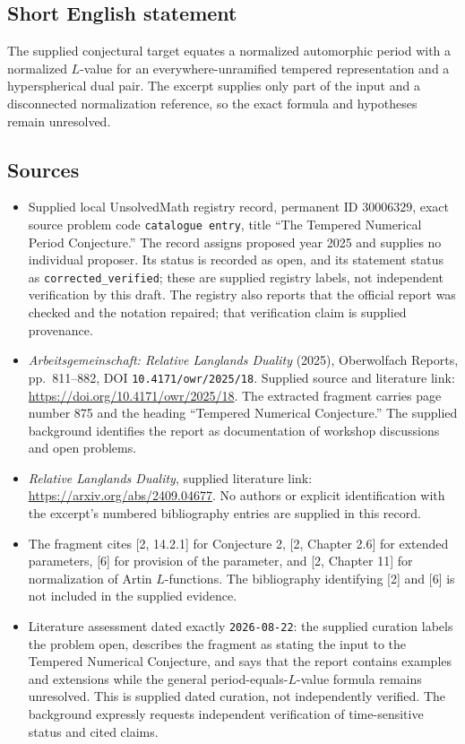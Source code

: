 \documentclass[11pt]{article}
\begin{document}
\subsection{Short English statement}
The supplied conjectural target equates a normalized automorphic period with a normalized \(L\)-value for an everywhere-unramified tempered representation and a hyperspherical dual pair. The excerpt supplies only part of the input and a disconnected normalization reference, so the exact formula and hypotheses remain unresolved.
\subsection{Sources}
\begin{itemize}
\item Supplied local UnsolvedMath registry record, permanent ID \(30006329\), exact source problem code \texttt{catalogue entry}, title ``The Tempered Numerical Period Conjecture.'' The record assigns proposed year 2025 and supplies no individual proposer. Its status is recorded as open, and its statement status as \texttt{corrected\_verified}; these are supplied registry labels, not independent verification by this draft. The registry also reports that the official report was checked and the notation repaired; that verification claim is supplied provenance.
\item \emph{Arbeitsgemeinschaft: Relative Langlands Duality} (2025), Oberwolfach Reports, pp.~811--882, DOI \texttt{10.4171/owr/2025/18}. Supplied source and literature link: \url{https://doi.org/10.4171/owr/2025/18}. The extracted fragment carries page number 875 and the heading ``Tempered Numerical Conjecture.'' The supplied background identifies the report as documentation of workshop discussions and open problems.
\item \emph{Relative Langlands Duality}, supplied literature link: \url{https://arxiv.org/abs/2409.04677}. No authors or explicit identification with the excerpt's numbered bibliography entries are supplied in this record.
\item The fragment cites [2, 14.2.1] for Conjecture 2, [2, Chapter 2.6] for extended parameters, [6] for provision of the parameter, and [2, Chapter 11] for normalization of Artin \(L\)-functions. The bibliography identifying [2] and [6] is not included in the supplied evidence.
\item Literature assessment dated exactly \texttt{2026-08-22}: the supplied curation labels the problem open, describes the fragment as stating the input to the Tempered Numerical Conjecture, and says that the report contains examples and extensions while the general period-equals-\(L\)-value formula remains unresolved. This is supplied dated curation, not independently verified. The background expressly requests independent verification of time-sensitive status and cited claims.
\end{itemize}
\end{document}
